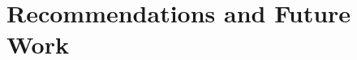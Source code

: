 \begin{comment}
		In the two-way t-test performed with the common samples against the isolates from iteration 3, there is a significant difference in both cases as seen with the alpha and p-values. This suggests that the tests were relevant. When the common samples are compared with the control group from iteration 4, the result is that they do not have any significant difference. However, when only the iteration 3 scores from the common samples are compared with the control group, the two-way t-test results show significant difference. 

		The application's usability was also compared with that of current tools in the market (see Table \ref{tab:app-usability-scores}). Both Komp and Notion were commercially available musical notation tools, with Notion being the top-rated application for musical notation. With that said, it is surprising to see that the difference between the usability scores of Flow and Notion are not that far. Flow sits at 3.0 while Notion is at 3.6, giving them only a difference of 0.6. In truth, comments between them were mixed. Around nine (9) composers said they liked Flow the most while around fourteen (14) said they preferred Notion, with two (2) composers liking Komp. From the qualitative interviews it was found that 20 out of the 25 total composers in iteration 3 and 4 combined liked Flow's interaction more than Notion. They preferred its simplicity and straightforwardness. Some comments were that the cursor and the notation menu made adding and selecting immediately understandable with just one glance. However, Notion beats Flow in terms of completeness of features, giving it a slightly higher score than Flow. 

		In summary, this study designed and developed an application that allows composers to perform compositional tasks like adding, editing, and deleting notes or rest. The interactions for these functions were designed and improved with the help of the users tests. Advanced tasks like cut/copy/paste or highlighting were also made possible through the use of gestures like dragging or swiping. The design and user experience of the application was tested repeatedly with composers of different skill levels through different setups and use cases over the course of four (4) iterations. 
		\end{comment}
		
	\section{Recommendations and Future Work}

